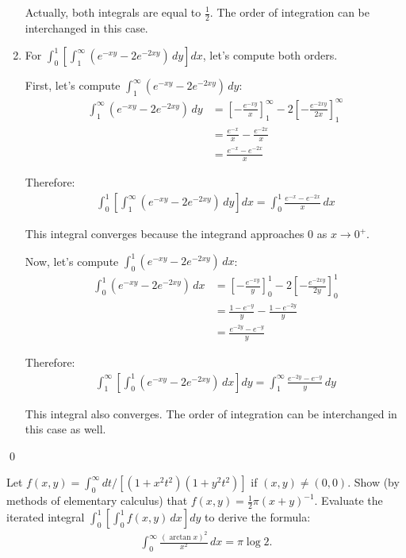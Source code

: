 \begin{enumerate}[label=(\alph*)]
Actually, both integrals are equal to $\frac{1}{2}$. The order of integration can be interchanged in this case.

\item For $\int_{0}^{1} \left[ \int_{1}^{\infty} (e^{-xy} - 2e^{-2xy}) \, dy \right] dx$, let's compute both orders.

First, let's compute $\int_{1}^{\infty} (e^{-xy} - 2e^{-2xy}) \, dy$:
\begin{align*}
\int_{1}^{\infty} (e^{-xy} - 2e^{-2xy}) \, dy &= \left[-\frac{e^{-xy}}{x}\right]_{1}^{\infty} - 2\left[-\frac{e^{-2xy}}{2x}\right]_{1}^{\infty} \\
&= \frac{e^{-x}}{x} - \frac{e^{-2x}}{x} \\
&= \frac{e^{-x} - e^{-2x}}{x}
\end{align*}

Therefore:
\begin{align*}
\int_{0}^{1} \left[ \int_{1}^{\infty} (e^{-xy} - 2e^{-2xy}) \, dy \right] dx = \int_{0}^{1} \frac{e^{-x} - e^{-2x}}{x} \, dx
\end{align*}

This integral converges because the integrand approaches 0 as $x \to 0^+$.

Now, let's compute $\int_{0}^{1} (e^{-xy} - 2e^{-2xy}) \, dx$:
\begin{align*}
\int_{0}^{1} (e^{-xy} - 2e^{-2xy}) \, dx &= \left[-\frac{e^{-xy}}{y}\right]_{0}^{1} - 2\left[-\frac{e^{-2xy}}{2y}\right]_{0}^{1} \\
&= \frac{1 - e^{-y}}{y} - \frac{1 - e^{-2y}}{y} \\
&= \frac{e^{-2y} - e^{-y}}{y}
\end{align*}

Therefore:
\begin{align*}
\int_{1}^{\infty} \left[ \int_{0}^{1} (e^{-xy} - 2e^{-2xy}) \, dx \right] dy = \int_{1}^{\infty} \frac{e^{-2y} - e^{-y}}{y} \, dy
\end{align*}

This integral also converges. The order of integration can be interchanged in this case as well.
\end{enumerate}\qed


\begin{problembox}
\begin{problemstatement}
Let $f(x, y) = \int_{0}^{\infty} dt / [(1 + x^{2}t^{2})(1 + y^{2}t^{2})]$ if $(x, y) \neq (0, 0)$. Show (by methods of elementary calculus) that $f(x, y) = \frac{1}{2}\pi(x + y)^{-1}$. Evaluate the iterated integral $\int_{0}^{1} \left[ \int_{0}^{1} f(x, y) \, dx \right] dy$ to derive the formula:
\begin{align*}
\int_{0}^{\infty} \frac{(\arctan x)^{2}}{x^{2}} \, dx = \pi \log 2.
\end{align*}
\end{problemstatement}
\end{problembox}

